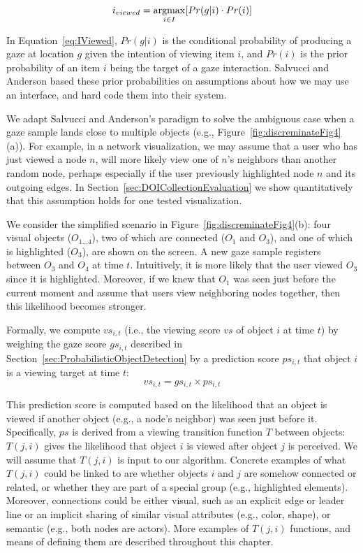 \begin{equation}
i_{viewed} = \displaystyle \operatorname*{argmax}_{i\in I}[Pr(g|i)\cdot Pr(i)]
\label{eq:IViewed}
\end{equation}

In Equation~\ref{eq:IViewed}, $Pr(g|i)$ is the conditional probability of producing a gaze at location $g$ given the intention of viewing item $i$, and $Pr(i)$ is the prior probability of an item $i$  being the target of a gaze interaction. Salvucci and Anderson based these prior probabilities on assumptions about how we may use an interface, and hard code them into their system.  

We adapt Salvucci and Anderson's paradigm to solve the ambiguous case when a gaze sample lands close to multiple objects (e.g.,  Figure~\ref{fig:discreminateFig4}(a)). For example, in a network visualization, we may assume that a user who has just viewed a node $n$, will more likely view one of $n$'s neighbors than another random node, perhaps especially if the user previously highlighted node $n$ and its outgoing edges.  In Section~\ref{sec:DOICollectionEvaluation} we show quantitatively that this assumption holds for one tested visualization.  

We consider the simplified scenario in Figure~\ref{fig:discreminateFig4}(b): four visual objects ($O_{1\ldots 4}$), two of which are connected ($O_1$ and $O_3$), and one of which is highlighted ($O_3$), are shown on the screen. A new gaze sample registers between $O_3$ and $O_4$ at time $t$. Intuitively, it is more likely that the user viewed $O_3$ since it is highlighted. Moreover, if we knew that $O_1$ was seen just before the current moment and assume that users view neighboring nodes together, then this likelihood becomes stronger.         
 
Formally, we compute $vs_{i,t}$  (i.e., the viewing score $vs$ of object $i$ at time $t$) by weighing the gaze score $gs_{i,t}$ described in Section~\ref{sec:ProbabilisticObjectDetection} by a prediction score $ps_{i,t}$ that object $i$ is a viewing target at time $t$:  
\begin{equation}
vs_{i,t} = gs_{i,t} \times ps_{i,t}
\label{eq:VS}
\end{equation}

This prediction score is computed based on the likelihood that an object is viewed if another object (e.g.,  a node's neighbor) was seen just before it. Specifically, $ps$ is derived from a viewing transition function $T$ between objects:  $T(j,i)$ gives the likelihood that object $i$ is viewed after object $j$ is perceived. We will assume that $T(j, i)$ is input to our algorithm. Concrete examples of what $T(j, i)$ could be linked to are whether objects $i$ and $j$ are somehow connected or related, or whether they are part of a special group (e.g., highlighted elements). Moreover, connections could be either visual, such as an explicit edge or leader line or an implicit sharing of similar visual attributes (e.g., color, shape), or semantic (e.g., both nodes are actors). More examples of $T(j, i)$ functions, and means of defining them are described throughout this chapter.

